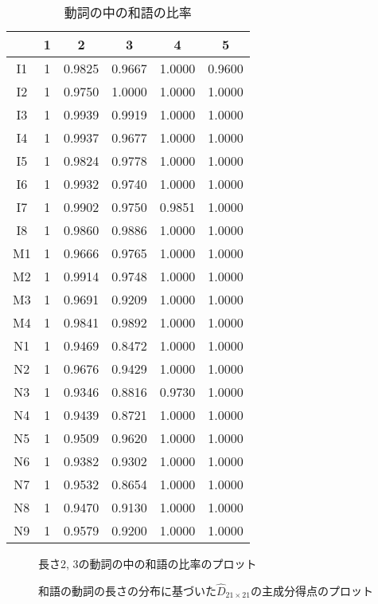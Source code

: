 \begin{table}[htb]
\caption{{\dg 動詞の中の和語の比率}\label{wagop}}
\begin{center}
\small{
\begin{tabular}{c    c c c c c} \hline
   & 1&    2     &     3    &     4    &    5   \\ \hline
I1 & 1&  0.9825& 0.9667& 1.0000&  0.9600 \\
I2 & 1&  0.9750& 1.0000& 1.0000&  1.0000\\
I3 & 1&  0.9939& 0.9919& 1.0000&  1.0000\\
I4 & 1&  0.9937& 0.9677& 1.0000&  1.0000 \\
I5 & 1&  0.9824& 0.9778& 1.0000&  1.0000 \\
I6 & 1&  0.9932& 0.9740& 1.0000&  1.0000\\
I7 & 1&  0.9902& 0.9750& 0.9851&  1.0000 \\
I8 & 1&  0.9860& 0.9886& 1.0000&  1.0000 \\
M1 & 1&  0.9666& 0.9765& 1.0000&  1.0000 \\
M2 & 1&  0.9914& 0.9748& 1.0000&  1.0000 \\
M3 & 1&  0.9691& 0.9209& 1.0000&  1.0000 \\
M4 & 1&  0.9841& 0.9892& 1.0000&  1.0000 \\
N1 & 1&  0.9469& 0.8472& 1.0000&  1.0000 \\
N2 & 1&  0.9676& 0.9429& 1.0000&  1.0000 \\
N3 & 1&  0.9346& 0.8816& 0.9730&  1.0000 \\
N4 & 1&  0.9439& 0.8721& 1.0000&  1.0000 \\
N5 & 1&  0.9509& 0.9620& 1.0000&  1.0000 \\
N6 & 1&  0.9382& 0.9302& 1.0000&  1.0000 \\
N7 & 1&  0.9532& 0.8654& 1.0000&  1.0000 \\
N8 & 1&  0.9470& 0.9130& 1.0000&  1.0000 \\
N9 & 1&  0.9579& 0.9200& 1.0000&  1.0000 \\ \hline
\end{tabular}
}
\end{center}
\end{table}

{\unitlength=1mm
\begin{figure}
\begin{center}
    
    
    
\end{center}
\caption{長さ2, 3の動詞の中の和語の比率のプロット}\label{wagopf}
\end{figure}


\begin{figure}
\begin{center}
    
    
    
\end{center}
\caption{和語の動詞の長さの分布に基づいた$\widehat{D}_{21 \times 21}$の主成分得点のプロット}\label{wagopf2}
\vspace*{14cm}
\end{figure}
}


